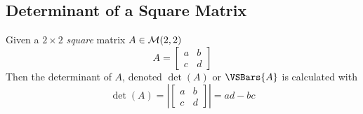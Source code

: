 \subsection{Determinant of a Square Matrix}

\begin{definition}
    Given a $2 \times 2$ \textit{square} matrix $A \in \mathcal{M}(2, 2)$
    \begin{equation}
        A = \begin{bmatrix}
            a & b \\
            c & d
        \end{bmatrix}
    \end{equation}
    Then the determinant of $A$, denoted $\det(A)$ or $\VSBars{A}$ is calculated with
    \begin{equation}
        \det(A) = 
        \left\vert
        \begin{bmatrix}
            a & b \\
            c & d
        \end{bmatrix}
        \right\vert
        =
        a d - b c
    \end{equation}
\end{definition}

